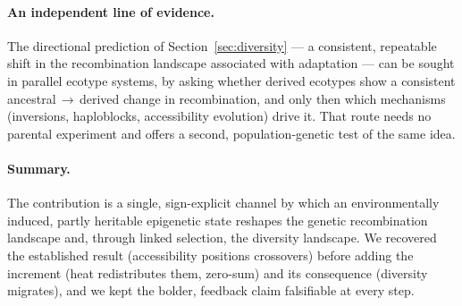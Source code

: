 \documentclass[11pt]{article}
\theoremstyle{remark}
\begin{document}
\paragraph{An independent line of evidence.} The directional prediction of
Section~\ref{sec:diversity} --- a consistent, repeatable shift in the
recombination landscape associated with adaptation --- can be sought in parallel
ecotype systems, by asking whether derived ecotypes show a consistent
ancestral$\,\to\,$derived change in recombination, and only then which mechanisms
(inversions, haploblocks, accessibility evolution) drive it. That route needs no
parental experiment and offers a second, population-genetic test of the same idea.

\paragraph{Summary.} The contribution is a single, sign-explicit channel by which
an environmentally induced, partly heritable epigenetic state reshapes the genetic
recombination landscape and, through linked selection, the diversity landscape. We
recovered the established result (accessibility positions crossovers) before
adding the increment (heat redistributes them, zero-sum) and its consequence
(diversity migrates), and we kept the bolder, feedback claim falsifiable at every
step.
\end{document}
